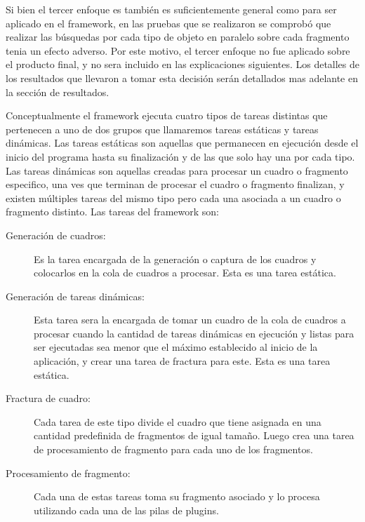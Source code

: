Si bien el tercer enfoque es también es suficientemente general como para ser
aplicado en el framework, en las pruebas que se realizaron se comprobó que
realizar las búsquedas por cada tipo de objeto en paralelo sobre cada fragmento
tenia un efecto adverso. Por este motivo, el tercer enfoque no fue aplicado
sobre el producto final, y no sera incluido en las explicaciones siguientes. Los
detalles de los resultados que llevaron a tomar esta decisión serán detallados
mas adelante en la sección de resultados.

Conceptualmente el framework ejecuta cuatro tipos de tareas distintas que
pertenecen a uno de dos grupos que llamaremos tareas estáticas y tareas
dinámicas. Las tareas estáticas son aquellas que permanecen en ejecución desde
el inicio del programa hasta su finalización y de las que solo hay una por cada
tipo. Las tareas dinámicas son aquellas creadas para procesar un cuadro o
fragmento especifico, una ves que terminan de procesar el cuadro o fragmento
finalizan, y existen múltiples tareas del mismo tipo pero cada una asociada a un
cuadro o fragmento distinto. Las tareas del framework son:

\begin{description}

	\item[Generación de cuadros:] Es la tarea encargada de la generación o
		captura de los cuadros y colocarlos en la cola de cuadros a
		procesar. Esta es una tarea estática.

	\item[Generación de tareas dinámicas:] Esta tarea sera la encargada de
		tomar un cuadro de la cola de cuadros a procesar cuando la
		cantidad de tareas dinámicas en ejecución y listas para ser
		ejecutadas sea menor que el máximo establecido al inicio de la
		aplicación, y crear una tarea de fractura para este. Esta es una
		tarea estática.

	\item[Fractura de cuadro:] Cada tarea de este tipo divide el cuadro que
		tiene asignada en una cantidad predefinida de fragmentos de
		igual tamaño. Luego crea una tarea de procesamiento de fragmento
		para cada uno de los fragmentos.

	\item[Procesamiento de fragmento:] Cada una de estas tareas toma su
		fragmento asociado y lo procesa utilizando cada una de las pilas
		de plugins.

\end{description}

